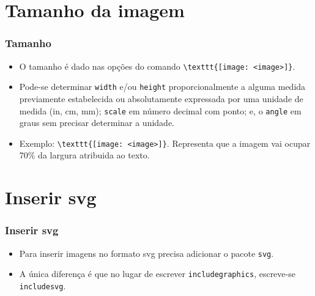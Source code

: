 \documentclass{beamer}
\begin{document}
\section{Tamanho da imagem}
\begin{frame}[fragile]
    \frametitle{Tamanho}

    \begin{itemize}
        \item O tamanho é dado nas opções do comando \lstinline[style=myStyleLatex]!\texttt{[image: <image>]}!.
        \item Pode-se determinar \texttt{width} e/ou \texttt{height} proporcionalmente a alguma medida previamente estabelecida ou absolutamente expressada por uma unidade de medida (in, cm, mm); \texttt{scale} em número decimal com ponto; e, o \texttt{angle} em graus sem precisar determinar a unidade.
        \item Exemplo: \lstinline[style=myStyleLatex]!\texttt{[image: <image>]}!. Representa que a imagem vai ocupar 70\% da largura atribuida ao texto.
    \end{itemize}

\end{frame}

\section{Inserir svg}
\begin{frame}
    \frametitle{Inserir svg}

    \begin{itemize}
        \item Para inserir imagens no formato svg precisa adicionar o pacote \texttt{svg}.
        \item A única diferença é que no lugar de escrever \texttt{includegraphics}, escreve-se \texttt{includesvg}.
    \end{itemize}

\end{frame}
\end{document}
